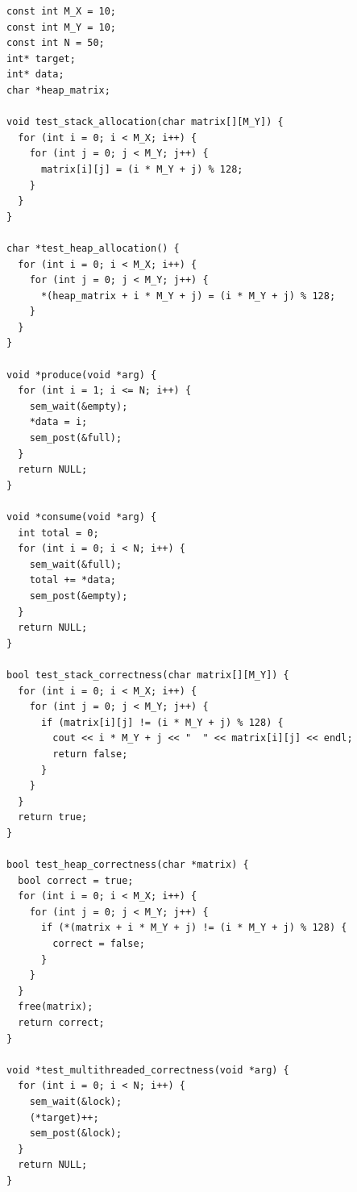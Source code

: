 \documentclass[bsc,frontabs,twoside,singlespacing,parskip,deptreport]{infthesis}     %
\begin{document}
\begin{verbatim}
const int M_X = 10;
const int M_Y = 10;
const int N = 50;
int* target;
int* data;
char *heap_matrix;

void test_stack_allocation(char matrix[][M_Y]) {
  for (int i = 0; i < M_X; i++) {
    for (int j = 0; j < M_Y; j++) {
      matrix[i][j] = (i * M_Y + j) % 128;
    }
  }
}

char *test_heap_allocation() {
  for (int i = 0; i < M_X; i++) {
    for (int j = 0; j < M_Y; j++) {
      *(heap_matrix + i * M_Y + j) = (i * M_Y + j) % 128;
    }
  }
}

void *produce(void *arg) {
  for (int i = 1; i <= N; i++) {
    sem_wait(&empty);
    *data = i;
    sem_post(&full);
  }
  return NULL;
}

void *consume(void *arg) {
  int total = 0;
  for (int i = 0; i < N; i++) {
    sem_wait(&full);
    total += *data;
    sem_post(&empty);
  }
  return NULL;
}

bool test_stack_correctness(char matrix[][M_Y]) {
  for (int i = 0; i < M_X; i++) {
    for (int j = 0; j < M_Y; j++) {
      if (matrix[i][j] != (i * M_Y + j) % 128) {
        cout << i * M_Y + j << "  " << matrix[i][j] << endl;
        return false;
      }
    }
  }
  return true;
}

bool test_heap_correctness(char *matrix) {
  bool correct = true;
  for (int i = 0; i < M_X; i++) {
    for (int j = 0; j < M_Y; j++) {
      if (*(matrix + i * M_Y + j) != (i * M_Y + j) % 128) {
        correct = false;
      }
    }
  }
  free(matrix);
  return correct;
}

void *test_multithreaded_correctness(void *arg) {
  for (int i = 0; i < N; i++) {
    sem_wait(&lock);
    (*target)++;
    sem_post(&lock);
  }
  return NULL;
}
\end{verbatim}
\end{document}
